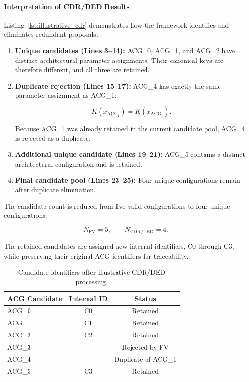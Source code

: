 \paragraph{Interpretation of CDR/DED Results}

Listing~\ref{lst:illustrative_cdr}
demonstrates how the framework identifies
and eliminates redundant proposals.

\begin{enumerate}

\item \textbf{Unique candidates (Lines 3--14):}
ACG\_0, ACG\_1, and ACG\_2 have distinct
architectural parameter assignments.
Their canonical keys are therefore
different, and all three are retained.

\item \textbf{Duplicate rejection (Lines 15--17):}
ACG\_4 has exactly the same parameter
assignment as ACG\_1:

\begin{equation}
K(x_{\mathrm{ACG}_4})
=
K(x_{\mathrm{ACG}_1}).
\end{equation}

Because ACG\_1 was already retained
in the current candidate pool,
ACG\_4 is rejected as a duplicate.

\item \textbf{Additional unique candidate
(Lines 19--21):}
ACG\_5 contains a distinct architectural
configuration and is retained.

\item \textbf{Final candidate pool
(Lines 23--25):}
Four unique configurations remain after
duplicate elimination.

\end{enumerate}

The candidate count is reduced from
five valid configurations to four
unique configurations:

\begin{equation}
N_{\mathrm{FV}} = 5,
\qquad
N_{\mathrm{CDR/DED}} = 4.
\end{equation}

The retained candidates are assigned
new internal identifiers, C0 through C3,
while preserving their original ACG
identifiers for traceability.

\begin{table}[htbp]
\centering
\caption{Candidate identifiers after
illustrative CDR/DED processing.}
\label{tab:illustrative_cdr_mapping}
\renewcommand{\arraystretch}{1.1}
\begin{tabular}{lcc}
\hline
\textbf{ACG Candidate} &
\textbf{Internal ID} &
\textbf{Status} \\
\hline
ACG\_0 & C0 & Retained \\
ACG\_1 & C1 & Retained \\
ACG\_2 & C2 & Retained \\
ACG\_3 & -- & Rejected by FV \\
ACG\_4 & -- & Duplicate of ACG\_1 \\
ACG\_5 & C3 & Retained \\
\hline
\end{tabular}
\end{table}

